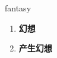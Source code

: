 
\begin{frame}
{\huge fantasy}
\begin{center}
\begin{enumerate}\Large
  \item \textbf{幻想}
  \item \textbf{产生幻想}
\end{enumerate}
\end{center}
\end{frame}
